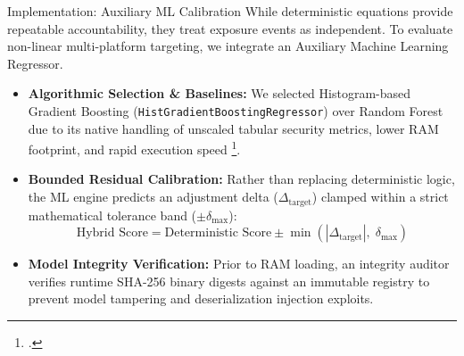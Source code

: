 \documentclass[aspectratio=169,10pt]{beamer}
\begin{document}
\begin{frame}{Implementation: Auxiliary ML Calibration}
  \small
  While deterministic equations provide repeatable accountability, they treat exposure events as independent. To evaluate non-linear multi-platform targeting, we integrate an Auxiliary Machine Learning Regressor.
  
  \vspace{0.20cm}
  \begin{itemize}\setlength{\itemsep}{0.22cm}
    \item \textbf{Algorithmic Selection \& Baselines:} We selected Histogram-based Gradient Boosting (\texttt{HistGradientBoostingRegressor}) over Random Forest due to its native handling of unscaled tabular security metrics, lower RAM footprint, and rapid execution speed \footcite{pedregosa2011, ke2017}.
    \item \textbf{Bounded Residual Calibration:} Rather than replacing deterministic logic, the ML engine predicts an adjustment delta ($\Delta_{\text{target}}$) clamped within a strict mathematical tolerance band ($\pm \delta_{\text{max}}$):
      $$\text{Hybrid Score} = \text{Deterministic Score} \pm \min(|\Delta_{\text{target}}|, \; \delta_{\text{max}})$$
    \item \textbf{Model Integrity Verification:} Prior to RAM loading, an integrity auditor verifies runtime SHA-256 binary digests against an immutable registry to prevent model tampering and deserialization injection exploits.
  \end{itemize}
\end{frame}
\end{document}
